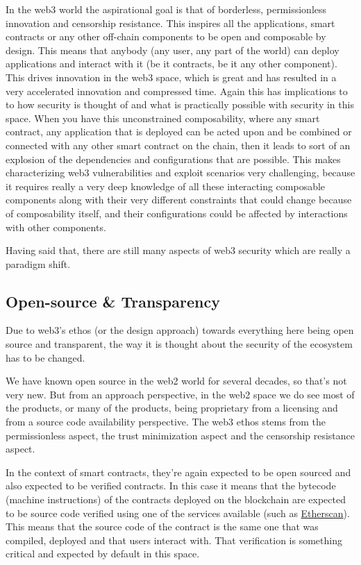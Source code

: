 In the web3 world the aspirational goal is that of borderless,
permissionless innovation and censorship resistance. This inspires all
the applications, smart contracts or any other off-chain components to
be open and composable by design. This means that anybody (any user, any
part of the world) can deploy applications and interact with it (be it
contracts, be it any other component). This drives innovation in the
web3 space, which is great and has resulted in a very accelerated
innovation and compressed time. Again this has implications to to how
security is thought of and what is practically possible with security in
this space. When you have this unconstrained composability, where any
smart contract, any application that is deployed can be acted upon and
be combined or connected with any other smart contract on the chain,
then it leads to sort of an explosion of the dependencies and
configurations that are possible. This makes characterizing web3
vulnerabilities and exploit scenarios very challenging, because it
requires really a very deep knowledge of all these interacting
composable components along with their very different constraints that
could change because of composability itself, and their configurations
could be affected by interactions with other components.

Having said that, there are still many aspects of web3 security which
are really a paradigm shift.

\subsection{Open-source \& Transparency}\label{open-source-transparency}

Due to web3's ethos (or the design approach) towards everything here
being open source and transparent, the way it is thought about the
security of the ecosystem has to be changed.

We have known open source in the web2 world for several decades, so
that's not very new. But from an approach perspective, in the web2 space
we do see most of the products, or many of the products, being
proprietary from a licensing and from a source code availability
perspective. The web3 ethos stems from the permissionless aspect, the
trust minimization aspect and the censorship resistance aspect.

In the context of smart contracts, they're again expected to be open
sourced and also expected to be verified contracts. In this case it
means that the bytecode (machine instructions) of the contracts deployed
on the blockchain are expected to be source code verified using one of
the services available (such as
\href{https://etherscan.io/}{Etherscan}). This means that the source
code of the contract is the same one that was compiled, deployed and
that users interact with. That verification is something critical and
expected by default in this space.

